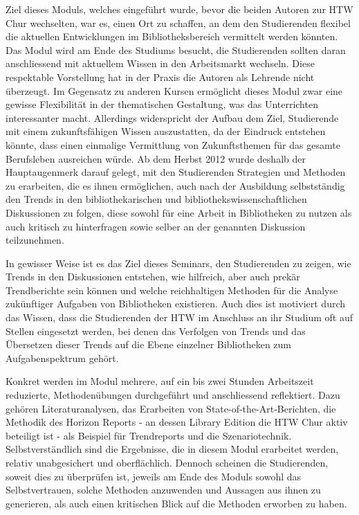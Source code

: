 \documentclass[a4paper,
fontsize=11pt,
oneside,
numbers=noperiodatend,
parskip=half-,
bibliography=totoc,
final
]{scrartcl}
\begin{document}
Ziel dieses Moduls, welches eingeführt wurde, bevor die beiden Autoren
zur HTW Chur wechselten, war es, einen Ort zu schaffen, an dem den
Studierenden flexibel die aktuellen Entwicklungen im Bibliotheksbereich
vermittelt werden könnten. Das Modul wird am Ende des Studiums besucht,
die Studierenden sollten daran anschliessend mit aktuellem Wissen in den
Arbeitsmarkt wechseln. Diese respektable Vorstellung hat in der Praxis
die Autoren als Lehrende nicht überzeugt. Im Gegensatz zu anderen Kursen
ermöglicht dieses Modul zwar eine gewisse Flexibilität in der
thematischen Gestaltung, was das Unterrichten interessanter macht.
Allerdings widerspricht der Aufbau dem Ziel, Studierende mit einem
zukunftsfähigen Wissen auszustatten, da der Eindruck entstehen könnte,
dass einen einmalige Vermittlung von Zukunftsthemen für das gesamte
Berufsleben ausreichen würde. Ab dem Herbst 2012 wurde deshalb der
Hauptaugenmerk darauf gelegt, mit den Studierenden Strategien und
Methoden zu erarbeiten, die es ihnen ermöglichen, auch nach der
Ausbildung selbstständig den Trends in den bibliothekarischen und
bibliothekswissenschaftlichen Diskussionen zu folgen, diese sowohl für
eine Arbeit in Bibliotheken zu nutzen als auch kritisch zu hinterfragen
sowie selber an der genannten Diskussion teilzunehmen.

In gewisser Weise ist es das Ziel dieses Seminars, den Studierenden zu
zeigen, wie Trends in den Diskussionen entstehen, wie hilfreich, aber
auch prekär Trendberichte sein können und welche reichhaltigen Methoden
für die Analyse zukünftiger Aufgaben von Bibliotheken existieren. Auch
dies ist motiviert durch das Wissen, dass die Studierenden der HTW im
Anschluss an ihr Studium oft auf Stellen eingesetzt werden, bei denen
das Verfolgen von Trends und das Übersetzen dieser Trends auf die Ebene
einzelner Bibliotheken zum Aufgabenspektrum gehört.

Konkret werden im Modul mehrere, auf ein bis zwei Stunden Arbeitszeit
reduzierte, Methodenübungen durchgeführt und anschliessend reflektiert.
Dazu gehören Literaturanalysen, das Erarbeiten von
State-of-the-Art-Berichten, die Methodik des Horizon Reports - an dessen
Library Edition die HTW Chur aktiv beteiligt ist - als Beispiel für
Trendreports und die Szenariotechnik. Selbstverständlich sind die
Ergebnisse, die in diesem Modul erarbeitet werden, relativ unabgesichert
und oberflächlich. Dennoch scheinen die Studierenden, soweit dies zu
überprüfen ist, jeweils am Ende des Moduls sowohl das Selbstvertrauen,
solche Methoden anzuwenden und Aussagen aus ihnen zu generieren, als
auch einen kritischen Blick auf die Methoden erworben zu haben.
\end{document}

